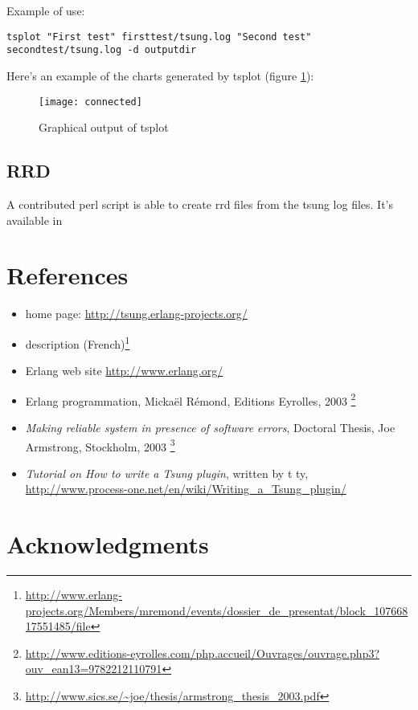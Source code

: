 \documentclass{TSUNG-en}
\begin{document}
Example of use:
\begin{Verbatim}
tsplot "First test" firsttest/tsung.log "Second test" secondtest/tsung.log -d outputdir
\end{Verbatim}

Here's an example of the charts generated by tsplot (figure \ref{fig:graph:tsplot}):

\begin{figure}[htb]
  \begin{center}
    \texttt{[image: connected]}
    \end{center}
      \caption{Graphical output of tsplot}
    \label{fig:graph:tsplot}
\end{figure}

\subsection{RRD}
A contributed perl script  is able to create rrd
files from the tsung log files. It's available in 

\section{References}

\begin{itemize}
\item {} home page: \url{http://tsung.erlang-projects.org/}
\item {} description (French)\footnote{\url{http://www.erlang-projects.org/Members/mremond/events/dossier_de_presentat/block_10766817551485/file}}
\item Erlang web site \url{http://www.erlang.org/}
\item Erlang programmation, Mickaël Rémond, Editions Eyrolles, 2003
  \footnote{\url{http://www.editions-eyrolles.com/php.accueil/Ouvrages/ouvrage.php3?ouv_ean13=9782212110791}}
\item \emph{Making reliable system in presence of software errors}, Doctoral Thesis,
Joe Armstrong, Stockholm, 2003 \footnote{\url{http://www.sics.se/~joe/thesis/armstrong_thesis_2003.pdf}}
\item \emph{Tutorial on How to write a Tsung plugin}, written by t ty, \url{http://www.process-one.net/en/wiki/Writing_a_Tsung_plugin/}
\end{itemize}

\section{Acknowledgments}
\end{document}

